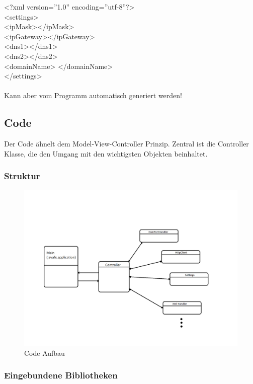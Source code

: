 \documentclass{article}
\begin{document}
		<?xml version=''1.0'' encoding=''utf-8''?>\\
		<settings>\\
		<ipMask></ipMask>\\
		<ipGateway></ipGateway>\\
		<dns1></dns1>\\
		<dns2></dns2>\\
		<domainName> </domainName>\\
		</settings>\\\\
		Kann aber vom Programm automatisch generiert werden!
		
	\subsection{Code}
		Der Code ähnelt dem Model-View-Controller Prinzip. Zentral ist die Controller Klasse, die den Umgang mit den wichtigsten Objekten beinhaltet.
		\subsubsection{Struktur}
		\begin{figure}[h]
			\includegraphics[scale=0.3]{Bilder/comuml.png}
			\centering
			\vspace{0 cm}
			\caption{Code Aufbau}
			\label{fig20}	
		\end{figure}
		\subsubsection{Eingebundene Bibliotheken}
		
\end{document}
